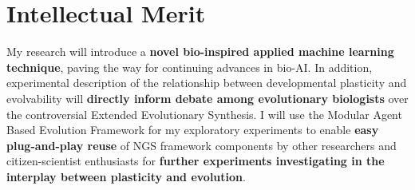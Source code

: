 \section{Intellectual Merit}
My research will introduce a \textbf{novel bio-inspired applied machine learning technique}, paving the way for continuing advances in bio-AI.
In addition, experimental description of the relationship between developmental plasticity and evolvability will \textbf{directly inform debate among evolutionary biologists} over the controversial Extended Evolutionary Synthesis.\autocite{Laland2014DoesRethink}
I will use the Modular Agent Based Evolution Framework for my exploratory experiments to enable \textbf{easy plug-and-play reuse} of NGS framework components by other researchers and citizen-scientist enthusiasts for \textbf{further experiments investigating in the interplay between plasticity and evolution}.\autocite{Hintze2017Mabe}
